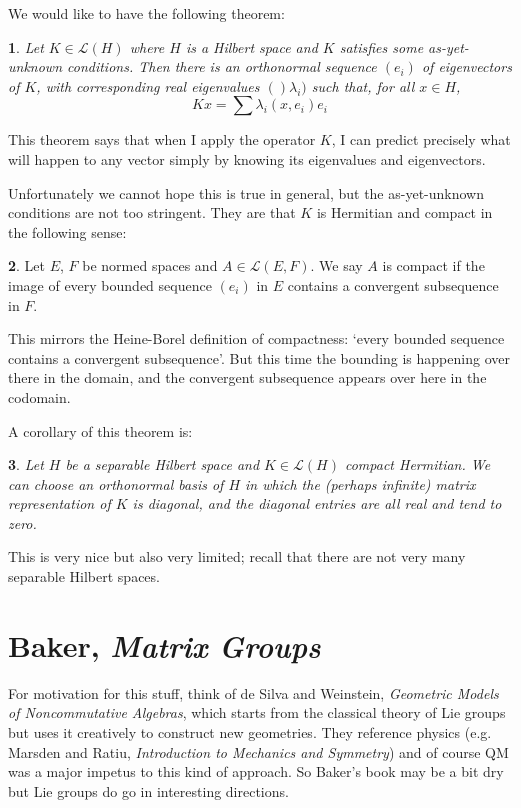 \documentclass[oneside,english]{amsbook}
\numberwithin{section}{chapter}
\theoremstyle{plain}
\newtheorem{thm}{\protect\theoremname}
\theoremstyle{definition}
\newtheorem{defn}[thm]{\protect\definitionname}
\providecommand{\definitionname}{Definition}
\providecommand{\theoremname}{Theorem}
\begin{document}
We would like to have the following theorem:

\begin{thm}
	Let $K\in\mathscr{L}(H)$ where $H$ is a Hilbert space and $K$ satisfies some as-yet-unknown conditions. Then there is an orthonormal sequence $(e_i)$ of eigenvectors of $K$, with corresponding real eigenvalues $()\lambda_i)$ such that, for all $x\in H$,
	\[
		Kx = \sum \lambda_i(x, e_i)e_i
	\]
\end{thm}

This theorem says that when I apply the operator $K$, I can predict precisely what will happen to any vector simply by knowing its eigenvalues and eigenvectors.

Unfortunately we cannot hope this is true in general, but the as-yet-unknown conditions are not too stringent. They are that $K$ is Hermitian and compact in the following sense:

\begin{defn}
	Let $E$, $F$ be normed spaces and $A\in \mathscr{L}(E, F)$. We say $A$ is compact if the image of every bounded sequence $(e_i)$ in $E$ contains a convergent subsequence in $F$.
\end{defn}

This mirrors the Heine-Borel definition of compactness: `every bounded sequence contains a convergent subsequence'. But this time the bounding is happening over there in the domain, and the convergent subsequence appears over here in the codomain.

A corollary of this theorem is:

\begin{thm}
	Let $H$ be a separable Hilbert space and $K\in\mathscr{L}(H)$ compact Hermitian. We can choose an orthonormal basis of $H$ in which the (perhaps infinite) matrix representation of $K$ is diagonal, and the diagonal entries are all real and tend to zero.
\end{thm}

This is very nice but also very limited; recall that there are not very many separable Hilbert spaces.

\chapter{Baker, \emph{Matrix Groups}}

For motivation for this stuff, think of de Silva and Weinstein, \emph{Geometric Models of Noncommutative Algebras}, which starts from the classical theory of Lie groups but uses it creatively to construct new geometries. They reference physics (e.g. Marsden and Ratiu, \emph{Introduction to Mechanics and Symmetry}) and of course QM was a major impetus to this kind of approach. So Baker's book may be a bit dry but Lie groups do go in interesting directions.
\end{document}
